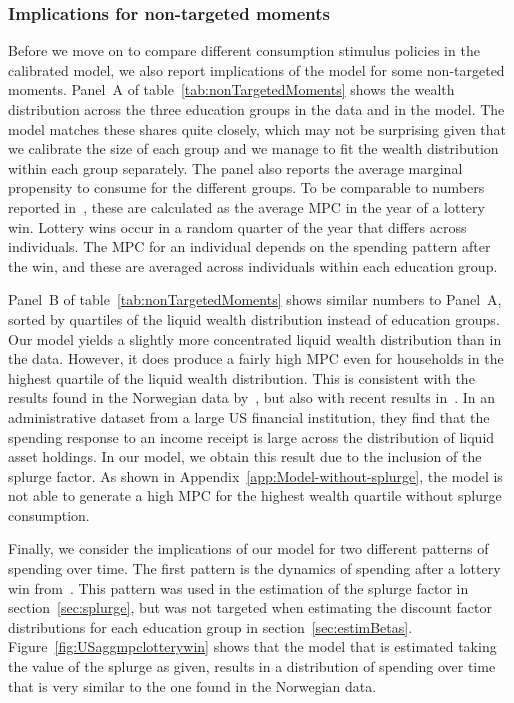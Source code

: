 \documentclass[\latexroot/\projectname]{subfiles}
\begin{document}
\subsubsection{Implications for non-targeted moments}\whenintegrated{\label{non-targeted-moments}}
\whenintegrated{\label{sec:nonTargetedMoments}}

Before we move on to compare different consumption stimulus policies in the calibrated model, we also report implications of the model for some non-targeted moments.
Panel~A of table~\ref{tab:nonTargetedMoments} shows the wealth distribution across the three education groups in the data and in the model.
The model matches these shares quite closely, which may not be surprising given that we calibrate the size of each group and we manage to fit the wealth distribution within each group separately.
The panel also reports the average marginal propensity to consume for the different groups.
To be comparable to numbers reported in~\cite{fagereng-mpc-2021}, these are calculated as the average MPC in the year of a lottery win.
Lottery wins occur in a random quarter of the year that differs across individuals.
The MPC for an individual depends on the spending pattern after the win, and these are averaged across individuals within each education group.

Panel~B of table~\ref{tab:nonTargetedMoments} shows similar numbers to Panel~A, sorted by quartiles of the liquid wealth distribution instead of education groups.
Our model yields a slightly more concentrated liquid wealth distribution than in the data.
However, it does produce a fairly high MPC even for households in the highest quartile of the liquid wealth distribution.
This is consistent with the results found in the Norwegian data by~\cite{fagereng-mpc-2021}, but also with recent results in~\cite{graham2024mental}.
In an administrative dataset from a large US financial institution, they find that the spending response to an income receipt is large across the distribution of liquid asset holdings.
In our model, we obtain this result due to the inclusion of the splurge factor.
As shown in Appendix~\ref{app:Model-without-splurge}, the model is not able to generate a high MPC for the highest wealth quartile without splurge consumption.


Finally, we consider the implications of our model for two different patterns of spending over time.
The first pattern is the dynamics of spending after a lottery win from~\citeauthor{fagereng-mpc-2021}.
This pattern was used in the estimation of the splurge factor in section~\ref{sec:splurge}, but was not targeted when estimating the discount factor distributions for each education group in section~\ref{sec:estimBetas}.
Figure~\ref{fig:USaggmpclotterywin} shows that the model that is estimated taking the value of the splurge as given, results in a distribution of spending over time that is very similar to the one found in the Norwegian data.
\end{document}
